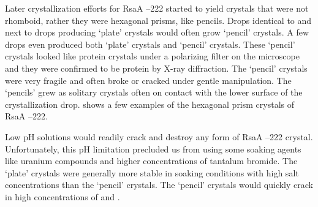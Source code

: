 Later crystallization efforts for RsaA --222 started to yield crystals that were not rhomboid, rather they were hexagonal prisms, like pencils. Drops identical to and next to drops producing `plate' crystals would often grow `pencil' crystals. A few drops even produced both `plate' crystals and `pencil' crystals. These `pencil' crystals looked like protein crystals under a polarizing filter on the microscope and they were confirmed to be protein by X-ray diffraction. The `pencil' crystals were very fragile and often broke or cracked under gentle manipulation. The `pencils' grew as solitary crystals often on contact with the lower surface of the crystallization drop.  shows a few examples of the hexagonal prism crystals of RsaA --222.

Low pH solutions would readily crack and destroy any form  of RsaA --222 crystal. Unfortunately, this pH limitation precluded us from using some soaking agents like uranium compounds and higher concentrations of tantalum bromide. The `plate' crystals were generally more stable in soaking conditions with high salt concentrations than the `pencil' crystals. The `pencil' crystals would quickly crack in high concentrations of  and .

